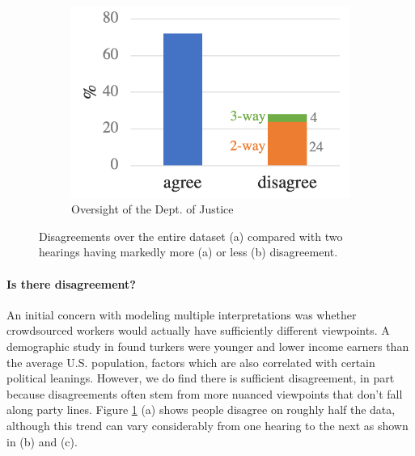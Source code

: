 \begin{figure}
\begin{subfigure}{.3\textwidth}
  \includegraphics[scale=0.3]{plots/subj_disagreement_whitaker.pdf}
  \vspace{-.3em}
  \caption{Oversight of the Dept. of Justice}
\end{subfigure}
\vspace{-0.5em}
  \caption{Disagreements over the entire dataset (a) compared with two hearings having markedly more (a) or less (b) disagreement.}
  \label{fig:subj_disagreement_hearing}
  \vspace{-.3em}
\end{figure}

\paragraph{Is there disagreement?} An initial concern with modeling multiple interpretations was whether crowdsourced workers would actually have sufficiently different viewpoints. A demographic study in  found turkers were younger and lower income earners than the average U.S. population, factors which are also correlated with certain political leanings. However, we do find there is sufficient disagreement, in part because disagreements often stem from more nuanced viewpoints that don't fall along party lines.
Figure \ref{fig:subj_disagreement_hearing} (a) shows people disagree on roughly half the data, although this trend can vary considerably from one hearing to the next as shown in (b) and (c).

